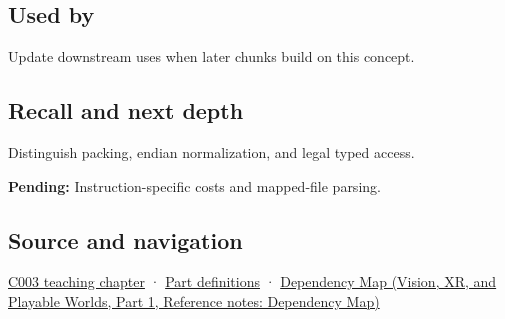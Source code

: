 \subsection{Used by}\label{appendix-0682dbfc5f0e-used-by}

\hypertarget{appendix-0682dbfc5f0e-used-by}{}

Update downstream uses when later chunks build on this concept.

\subsection{Recall and next depth}\label{appendix-0682dbfc5f0e-recall-and-next-depth}

\hypertarget{appendix-0682dbfc5f0e-recall-and-next-depth}{}

Distinguish packing, endian normalization, and legal typed access.

\textbf{Pending:} Instruction-specific costs and mapped-file parsing.

\subsection{Source and navigation}\label{appendix-0682dbfc5f0e-source-and-navigation}

\hypertarget{appendix-0682dbfc5f0e-source-and-navigation}{}

\hyperref[01-foundations-i-ch002-where-the-bytes-live]{C003 teaching chapter} · \hyperref[appendix-fd090d982a15-m003---parts-41-60]{Part definitions} · \href{../07-Vision-XR-and-Playable-Worlds-P01/main.pdf\#appendix-4ad47bdd269a}{Dependency Map (Vision, XR, and Playable Worlds, Part 1, Reference notes: Dependency Map)}

